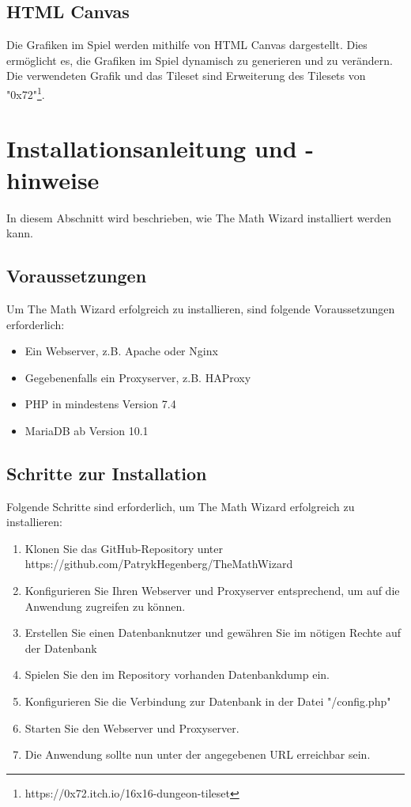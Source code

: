 \documentclass[fontsize:11pt]{article}
\begin{document}
    \subsection{HTML Canvas}
        Die Grafiken im Spiel werden mithilfe von HTML Canvas dargestellt. Dies ermöglicht es, die Grafiken im Spiel dynamisch zu generieren und zu verändern. Die verwendeten Grafik und das Tileset sind Erweiterung des Tilesets von "0x72"\footnote{https://0x72.itch.io/16x16-dungeon-tileset}.

\section{Installationsanleitung und -hinweise}
    In diesem Abschnitt wird beschrieben, wie The Math Wizard installiert werden kann.
    \subsection{Voraussetzungen}
        Um The Math Wizard erfolgreich zu installieren, sind folgende Voraussetzungen erforderlich:
        \begin{itemize}
        \item Ein Webserver, z.B. Apache oder Nginx
        \item Gegebenenfalls ein Proxyserver, z.B. HAProxy
        \item PHP in mindestens Version 7.4
        \item MariaDB ab Version 10.1
        \end{itemize}
    \subsection{Schritte zur Installation}
        Folgende Schritte sind erforderlich, um The Math Wizard erfolgreich zu installieren:
        \begin{enumerate}
        \item Klonen Sie das GitHub-Repository unter https://github.com/PatrykHegenberg/TheMathWizard
        \item Konfigurieren Sie Ihren Webserver und Proxyserver entsprechend, um auf die Anwendung zugreifen zu können.
        \item Erstellen Sie einen Datenbanknutzer und gewähren Sie im nötigen Rechte auf der Datenbank
        \item Spielen Sie den im Repository vorhanden Datenbankdump ein.
        \item Konfigurieren Sie die Verbindung zur Datenbank in der Datei "/config.php"
        \item Starten Sie den Webserver und Proxyserver.
        \item Die Anwendung sollte nun unter der angegebenen URL erreichbar sein.
        \end{enumerate}
\end{document}

